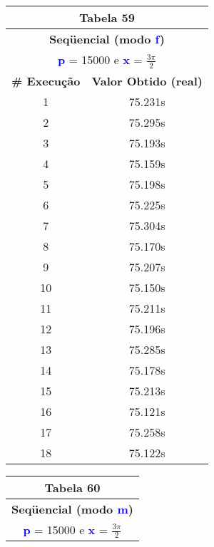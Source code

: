 \documentclass[11pt]{article}
\begin{document}
\begin{table}[!h]
	\begin{center}
		\begin{minipage}{0.48\textwidth}
			\begin{tabular}{| c | c |}
			\hline
			\multicolumn{2}{|c|}{\textbf{Tabela 59}} \\ \hline
			\multicolumn{2}{|c|}{\textbf{Seqüencial (modo \textbf{\textcolor{blue}{f}})}} \\
			\multicolumn{2}{|c|}{\textbf{\textcolor{blue}{p}} = 15000 e \textbf{\textcolor{blue}{x}} = $\frac{3\pi}{2}$} \\ [0.2ex]
			\hline
				\textbf{\# Execução} &  \textbf{Valor Obtido (real)} \\ \hline
				1 & 75.231s \\ \hline
				2 & 75.295s \\ \hline
				3 & 75.193s \\ \hline
				4 & 75.159s \\ \hline
				5 & 75.198s \\ \hline
				6 & 75.225s \\ \hline
				7 & 75.304s \\ \hline
				8 & 75.170s \\ \hline
				9 & 75.207s \\ \hline
				10 & 75.150s \\ \hline
				11 & 75.211s \\ \hline
				12 & 75.196s \\ \hline
				13 & 75.285s \\ \hline
				14 & 75.178s \\ \hline
				15 & 75.213s \\ \hline
				16 & 75.121s \\ \hline
				17 & 75.258s \\ \hline
				18 & 75.122s \\ \hline
			\end{tabular}
		\end{minipage}
		\begin{minipage}{0.48\textwidth}
			\begin{tabular}{| c | c |}
			\hline
			\multicolumn{2}{|c|}{\textbf{Tabela 60}} \\ \hline
			\multicolumn{2}{|c|}{\textbf{Seqüencial (modo \textbf{\textcolor{blue}{m}})}} \\
			\multicolumn{2}{|c|}{\textbf{\textcolor{blue}{p}} = 15000 e \textbf{\textcolor{blue}{x}} = $\frac{3\pi}{2}$} \\ [0.2ex]

\end{tabular}
\end{minipage}
\end{center}
\end{table}
\end{document}
